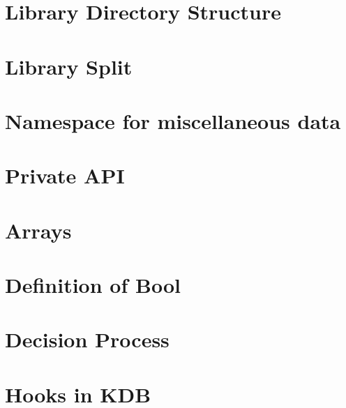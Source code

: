 \let\mypdfximage\pdfximage\def\pdfximage{\immediate\mypdfximage}\documentclass[twoside]{book}
\newcommand{\+}{\discretionary{\mbox{\scriptsize$\hookleftarrow$}}{}{}}
\begin{document}
\chapter{Library Directory Structure}
\label{doc_decisions_4_decided_library_directory_structure_md}

\chapter{Library Split}
\label{doc_decisions_4_decided_library_split_md}

\chapter{Namespace for miscellaneous data}
\label{doc_decisions_4_decided_misc_namespace_md}

\chapter{Private API}
\label{doc_decisions_4_decided_private_api_md}

\chapter{Arrays}
\label{doc_decisions_5_partially_implemented_array_md}

\chapter{Definition of Bool}
\label{doc_decisions_5_partially_implemented_boolean_md}

\chapter{Decision Process}
\label{doc_decisions_5_partially_implemented_decision_process_md}

\chapter{Hooks in KDB}
\label{doc_decisions_5_partially_implemented_hooks_md}

\end{document}
